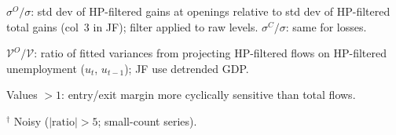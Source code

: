 \begin{table}[htbp]
\begin{tablenotes}[flushleft]
\item $\sigma^O/\sigma$: std dev of HP-filtered gains at openings relative to std dev of HP-filtered total gains (col~3 in JF); filter applied to raw levels. $\sigma^C/\sigma$: same for losses.
\item $\mathcal{V}^O/\mathcal{V}$: ratio of fitted variances from projecting HP-filtered flows on HP-filtered unemployment ($u_t$, $u_{t-1}$); JF use detrended GDP.
\item Values $>1$: entry/exit margin more cyclically sensitive than total flows.
\item $^\dagger$ Noisy ($|\text{ratio}|>5$; small-count series).
\end{tablenotes}
\end{table}
